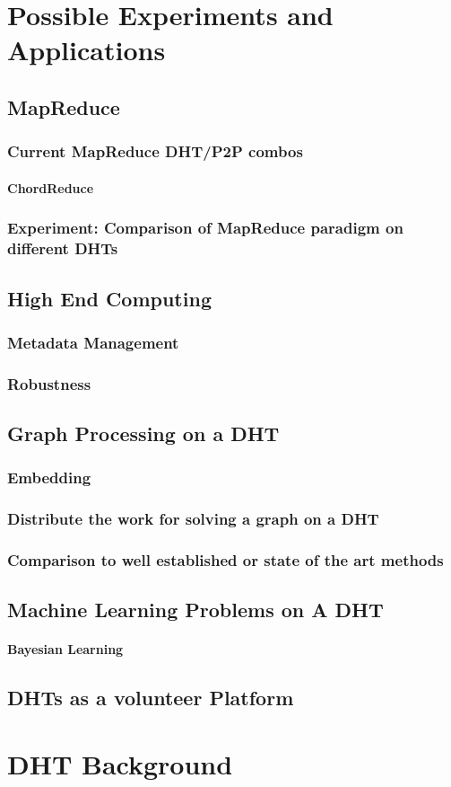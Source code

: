 \documentclass[10pt,letterpaper]{report}
\begin{document}
\chapter{Possible Experiments and Applications}


\section{MapReduce}
\subsection{Current MapReduce DHT/P2P combos}
\subsubsection{ChordReduce}
\subsection{Experiment: Comparison of MapReduce paradigm on different DHTs}


\section{High End Computing}
\subsection{Metadata Management}
\subsection{Robustness}

\section{Graph Processing on a DHT}
\subsection{Embedding}
\subsection{Distribute the work for solving a graph on a DHT}
\subsection{Comparison to well established or state of the art methods}

\section{Machine Learning Problems on A DHT}
\subsubsection{Bayesian Learning}

\section{DHTs as a volunteer Platform}

\chapter{DHT Background}





\end{document}
